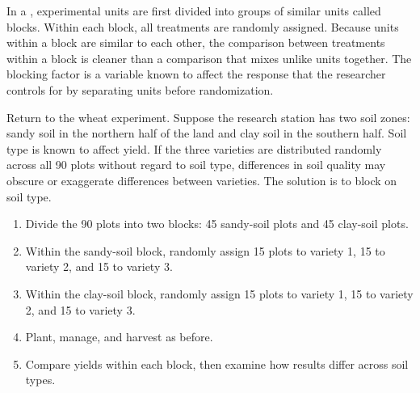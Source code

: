 In a , experimental units are first divided into groups of similar units called blocks. Within each block, all treatments are randomly assigned. Because units within a block are similar to each other, the comparison between treatments within a block is cleaner than a comparison that mixes unlike units together. The blocking factor is a variable known to affect the response that the researcher controls for by separating units before randomization.

Return to the wheat experiment. Suppose the research station has two soil zones: sandy soil in the northern half of the land and clay soil in the southern half. Soil type is known to affect yield. If the three varieties are distributed randomly across all 90 plots without regard to soil type, differences in soil quality may obscure or exaggerate differences between varieties. The solution is to block on soil type.

\begin{enumerate}
    \item Divide the 90 plots into two blocks: 45 sandy-soil plots and 45 clay-soil plots.
    \item Within the sandy-soil block, randomly assign 15 plots to variety 1, 15 to variety 2, and 15 to variety 3.
    \item Within the clay-soil block, randomly assign 15 plots to variety 1, 15 to variety 2, and 15 to variety 3.
    \item Plant, manage, and harvest as before.
    \item Compare yields within each block, then examine how results differ across soil types.
\end{enumerate}

